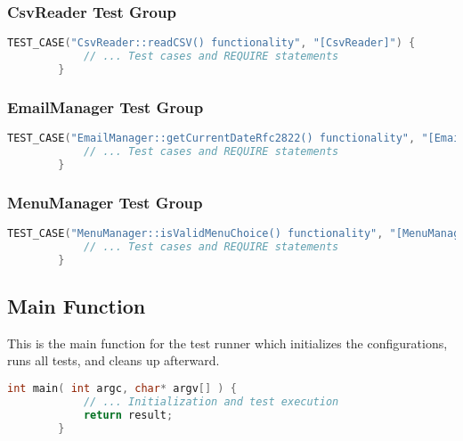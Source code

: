 \documentclass{article}
\begin{document}
	\subsubsection*{CsvReader Test Group}
	\begin{lstlisting}[language=C++]
		TEST_CASE("CsvReader::readCSV() functionality", "[CsvReader]") {
			// ... Test cases and REQUIRE statements
		}
	\end{lstlisting}
	
	
	\subsubsection*{EmailManager Test Group}
	\begin{lstlisting}[language=C++]
		TEST_CASE("EmailManager::getCurrentDateRfc2822() functionality", "[EmailManager]") {
			// ... Test cases and REQUIRE statements
		}
	\end{lstlisting}
	
	
	\subsubsection*{MenuManager Test Group}
	\begin{lstlisting}[language=C++]
		TEST_CASE("MenuManager::isValidMenuChoice() functionality", "[MenuManager]") {
			// ... Test cases and REQUIRE statements
		}
	\end{lstlisting}
	
	
	\subsection*{Main Function}
	This is the main function for the test runner which initializes the configurations, runs all tests, and cleans up afterward.
	
	\begin{lstlisting}[language=C++]
		int main( int argc, char* argv[] ) {
			// ... Initialization and test execution
			return result;
		}
	\end{lstlisting}
	
\end{document}
